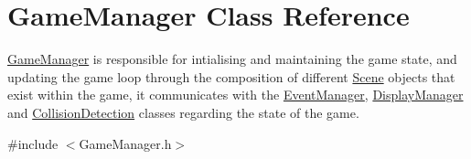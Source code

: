 \hypertarget{class_game_manager}{}\section{Game\+Manager Class Reference}
\label{class_game_manager}


\hyperlink{class_game_manager}{Game\+Manager} is responsible for intialising and maintaining the game state, and updating the game loop through the composition of different \hyperlink{class_scene}{Scene} objects that exist within the game, it communicates with the \hyperlink{class_event_manager}{Event\+Manager}, \hyperlink{class_display_manager}{Display\+Manager} and \hyperlink{class_collision_detection}{Collision\+Detection} classes regarding the state of the game.  




{\ttfamily \#include $<$Game\+Manager.\+h$>$}

